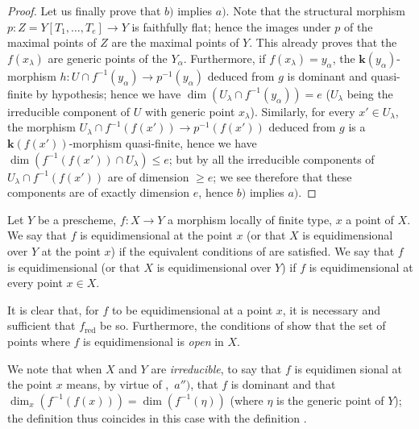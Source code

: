 \begin{proof}
Let us finally prove that $b)$ implies $a)$.
Note that the structural morphism $p:Z=Y[T_1,\ldots,T_e]\to Y$ is faithfully flat; hence  the images under $p$ of the maximal points of $Z$ are the maximal points of $Y$. This already proves that the $f(x_\lambda)$ are generic points of the $Y_\alpha$.
Furthermore, if $f(x_\lambda)=y_\alpha$, the $\boldsymbol{k}(y_\alpha)$-morphism $h:U\cap f^{-1}(y_\alpha)\to p^{-1}(y_\alpha)$ deduced from $g$ is dominant and quasi-finite by hypothesis; hence  we have $\dim(U_\lambda\cap f^{-1}(y_\alpha))=e$ ($U_\lambda$ being the irreducible component of $U$ with generic point $x_\lambda$).
Similarly, for every $x'\in U_\lambda$, the morphism $U_\lambda\cap f^{-1}(f(x'))\to p^{-1}(f(x'))$ deduced from $g$ is a $\boldsymbol{k}(f(x'))$-morphism quasi-finite, hence  we have $\dim(f^{-1}(f(x'))\cap U_\lambda)\leq e$; but by  all the irreducible components of $U_\lambda\cap f^{-1}(f(x'))$ are of dimension $\geq e$; we see therefore that these components are of exactly dimension $e$, hence $b)$ implies $a)$.
\end{proof}

\begin{definition}[13.3.2]
\label{IV.13.3.2}
Let $Y$ be a prescheme, $f:X\to Y$ a morphism locally of finite type, $x$ a point of $X$.
We say that $f$ is \textup{equidimensional at the point} $x$ (or that $X$ is \textup{equidimensional over $Y$ at the point} $x$) if the equivalent conditions of  are satisfied.
We say that $f$ is \textup{equidimensional} (or that $X$ is \textup{equidimensional over $Y$)} if $f$ is equidimensional at every point $x\in X$.
\end{definition}

It is clear that, for $f$ to be equidimensional at a point $x$, it is necessary and sufficient that $f_{\mathrm{red}}$ be so.
Furthermore, the conditions of  show that the set of points where $f$ is equidimensional is \emph{open} in $X$.

We note that when $X$ and $Y$ are \emph{irreducible}, to say that $f$ is equidimen%
%
sional at the point $x$ means, by virtue of ,~$a'')$, that $f$ is dominant and that $\dim_x(f^{-1}(f(x)))=\dim(f^{-1}(\eta))$ (where $\eta$ is the generic point of $Y$); the definition  thus coincides in this case with the definition .

